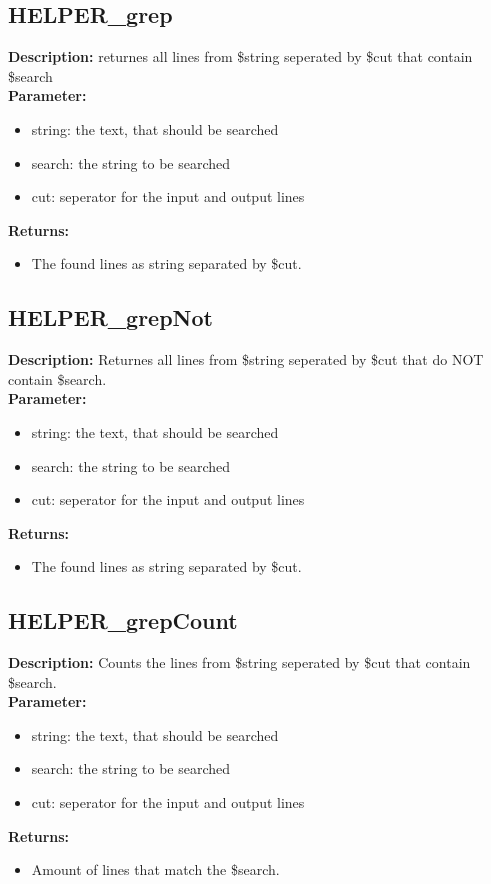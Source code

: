 \subsection{HELPER\_grep}
\textbf{Description:} returnes all lines from \$string seperated by \$cut that contain \$search\\
\textbf{Parameter:}
\begin{itemize}
\item string: the text, that should be searched
\item search: the string to be searched
\item cut: seperator for the input and output lines
\end{itemize}
\textbf{Returns:}
\begin{itemize}
\item The found lines as string separated by \$cut.
\end{itemize}

\subsection{HELPER\_grepNot}
\textbf{Description:} Returnes all lines from \$string seperated by \$cut that do NOT contain \$search.\\
\textbf{Parameter:}
\begin{itemize}
\item string: the text, that should be searched
\item search: the string to be searched
\item cut: seperator for the input and output lines
\end{itemize}
\textbf{Returns:}
\begin{itemize}
\item The found lines as string separated by \$cut.
\end{itemize}

\subsection{HELPER\_grepCount}
\textbf{Description:} Counts the lines from \$string seperated by \$cut that contain \$search.\\
\textbf{Parameter:}
\begin{itemize}
\item string: the text, that should be searched
\item search: the string to be searched
\item cut: seperator for the input and output lines
\end{itemize}
\textbf{Returns:}
\begin{itemize}
\item Amount of lines that match the \$search.
\end{itemize}

